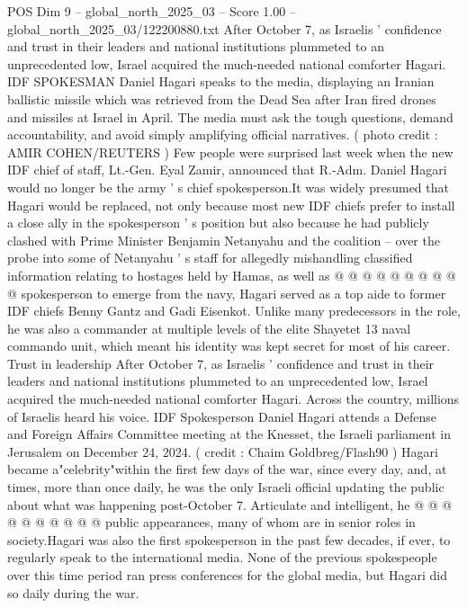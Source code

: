\begin{textsample}{POS Dim 9 – global\_north\_2025\_03 – Score 1.00 – global\_north\_2025\_03/122200880.txt}  \label{ex:f9_pos_382}
After October 7, as Israelis ' confidence and trust in their leaders and national institutions plummeted to an unprecedented low, Israel acquired the much-needed national comforter Hagari.
IDF SPOKESMAN Daniel Hagari speaks to the media, displaying an Iranian ballistic missile which was retrieved from the Dead Sea after Iran fired drones and missiles at Israel in April.
The media must ask the tough questions, demand accountability, and avoid simply amplifying official narratives. ( photo credit : AMIR COHEN/REUTERS ) Few people were surprised last week when the new IDF chief of staff, Lt.-Gen.
Eyal Zamir, announced that R.-Adm.
Daniel Hagari would no longer be the army ' s chief spokesperson.It was widely presumed that Hagari would be replaced, not only because most new IDF chiefs prefer to install a close ally in the spokesperson ' s position but also because he had publicly clashed with Prime Minister Benjamin Netanyahu and the coalition -- over the probe into some of Netanyahu ' s staff for allegedly mishandling classified information relating to hostages held by Hamas, as well as @ @ @ @ @ @ @ @ @ @ spokesperson to emerge from the navy, Hagari served as a top aide to former IDF chiefs Benny Gantz and Gadi Eisenkot.
Unlike many predecessors in the role, he was also a commander at multiple levels of the elite Shayetet 13 naval commando unit, which meant his identity was kept secret for most of his career.
Trust in leadership After October 7, as Israelis ' confidence and trust in their leaders and national institutions plummeted to an unprecedented low, Israel acquired the much-needed national comforter Hagari.
Across the country, millions of Israelis heard his voice.
IDF Spokesperson Daniel Hagari attends a Defense and Foreign Affairs Committee meeting at the Knesset, the Israeli parliament in Jerusalem on December 24, 2024. ( credit : Chaim Goldbreg/Flash90 ) Hagari became a"celebrity"within the first few days of the war, since every day, and, at times, more than once daily, he was the only Israeli official updating the public about what was happening post-October 7.
Articulate and intelligent, he @ @ @ @ @ @ @ @ @ @ public appearances, many of whom are in senior roles in society.Hagari was also the first spokesperson in the past few decades, if ever, to regularly speak to the international media.
None of the previous spokespeople over this time period ran press conferences for the global media, but Hagari did so daily during the war.

\end{textsample}
